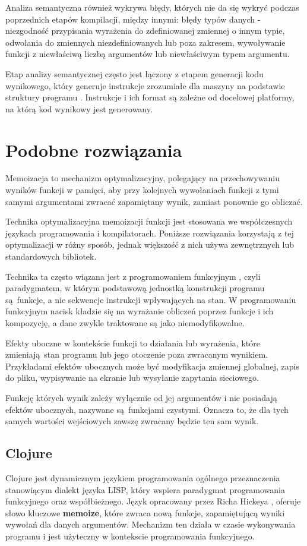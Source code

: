 Analiza semantyczna również wykrywa błędy, których nie da się wykryć podczas poprzednich etapów kompilacji, między innymi: błędy typów danych - niezgodność przypisania wyrażenia do zdefiniowanej zmiennej o innym typie, odwołania do zmiennych niezdefiniowanych lub poza zakresem, wywoływanie funkcji z niewłaściwą liczbą argumentów lub niewłaściwym typem argumentu.

\newpage
Etap analizy semantycznej często jest łączony z etapem generacji kodu wynikowego, który generuje instrukcje zrozumiałe dla maszyny na podstawie struktury programu \cite{bib:writing-c-compiler}. Instrukcje i ich format są zależne od docelowej platformy, na którą kod wynikowy jest generowany.

\section{Podobne rozwiązania}

Memoizacja to mechanizm optymalizacyjny, polegający na przechowywaniu wyników funkcji w pamięci, aby przy kolejnych wywołaniach funkcji z tymi samymi argumentami zwracać zapamiętany wynik, zamiast ponownie go obliczać.

Technika optymalizacyjna memoizacji funkcji jest stosowana we współczesnych językach programowania i kompilatorach. Poniższe rozwiązania korzystają z tej optymalizacji w różny sposób, jednak większość z nich używa zewnętrznych lub standardowych bibliotek. 

Technika ta często wiązana jest z programowaniem funkcyjnym \cite{bib:haskell-functional-programming}, czyli paradygmatem, w którym podstawową jednostką konstrukcji programu są funkcje, a nie sekwencje instrukcji wpływających na stan. W programowaniu funkcyjnym nacisk kładzie się na wyrażanie obliczeń poprzez funkcje i ich kompozycję, a dane zwykle traktowane są jako niemodyfikowalne.

Efekty uboczne w kontekście funkcji to działania lub wyrażenia, które zmieniają stan programu lub jego otoczenie poza zwracanym wynikiem. Przykładami efektów ubocznych może być modyfikacja zmiennej globalnej, zapis do pliku, wypisywanie na ekranie lub wysyłanie zapytania sieciowego.

Funkcję których wynik zależy wyłącznie od jej argumentów i nie posiadają efektów ubocznych, nazywane są funkcjami czystymi. Oznacza to, że dla tych samych wartości wejściowych zawszę zwracany będzie ten sam wynik.

\subsection{Clojure}
Clojure jest dynamicznym językiem programowania ogólnego przeznaczenia stanowiącym dialekt języka LISP, który wspiera paradygmat programowania funkcyjnego oraz współbieżnego. Język opracowany przez Richa Hickeya \cite{bib:clojure}, oferuje słowo kluczowe \textbf{memoize}, które zwraca nową funkcje, zapamiętującą wyniki wywołań dla danych argumentów. Mechanizm ten działa w czasie wykonywania programu i jest użyteczny w kontekscie programowania funkcyjnego.
